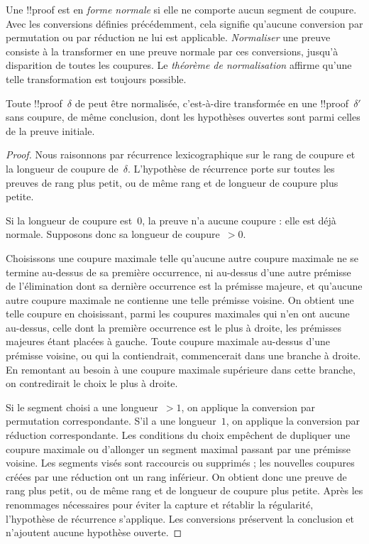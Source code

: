 \documentclass[../../../include/open-logic-section]{subfiles}
\begin{document}


Une !!{proof} est en \emph{forme normale} si elle
ne comporte aucun segment de coupure. Avec les
conversions définies précédemment, cela signifie
qu'aucune conversion par permutation ou par
réduction ne lui est applicable.
\emph{Normaliser} une preuve consiste à la
transformer en une preuve normale par ces
conversions, jusqu'à disparition de toutes les
coupures. Le \emph{théorème de normalisation}
affirme qu'une telle transformation est
toujours possible.

\begin{thm}
Toute !!{proof}~$\delta$ de  peut
être normalisée, c'est-à-dire transformée
en une !!{proof}~$\delta'$ sans coupure,
de même conclusion, dont les hypothèses
ouvertes sont parmi celles de la preuve
initiale.
\end{thm}

\begin{proof}
Nous raisonnons par récurrence lexicographique
sur le rang de coupure et la longueur de
coupure de~$\delta$. L'hypothèse de récurrence
porte sur toutes les preuves de rang plus
petit, ou de même rang et de longueur de
coupure plus petite.

Si la longueur de coupure est~$0$, la preuve
n'a aucune coupure : elle est déjà normale.
Supposons donc sa longueur de coupure~$>0$.

Choisissons une coupure maximale telle
qu'aucune autre coupure maximale ne se
termine au-dessus de sa première occurrence,
ni au-dessus d'une autre prémisse de
l'élimination dont sa dernière occurrence
est la prémisse majeure, et qu'aucune autre
coupure maximale ne contienne une telle
prémisse voisine.
On obtient une telle coupure en choisissant, parmi les coupures
maximales qui n'en ont aucune au-dessus, celle dont la première
occurrence est le plus à droite, les prémisses majeures étant
placées à gauche. Toute coupure maximale au-dessus d'une prémisse
voisine, ou qui la contiendrait, commencerait dans une branche à
droite. En remontant au besoin à une coupure maximale supérieure
dans cette branche, on contredirait le choix le plus à droite.


Si le segment choisi a une longueur~$>1$,
on applique la conversion par permutation
correspondante. S'il a une longueur~$1$,
on applique la conversion par réduction
correspondante. Les conditions du choix
empêchent de dupliquer une coupure
maximale ou d'allonger un segment maximal
passant par une prémisse voisine.
Les segments visés sont raccourcis ou
supprimés ; les nouvelles coupures
créées par une réduction ont un rang
inférieur. On obtient donc une preuve
de rang plus petit, ou de même rang et
de longueur de coupure plus petite.
Après les renommages nécessaires pour
éviter la capture et rétablir la régularité,
l'hypothèse de récurrence s'applique.
Les conversions préservent la conclusion
et n'ajoutent aucune hypothèse ouverte.
\end{proof}
\end{document}
